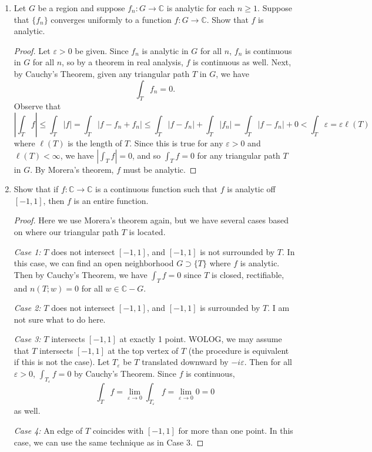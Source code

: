 \documentclass[11pt,oneside,english]{amsart}
\theoremstyle{definition}
\newcommand{\lom}[2]{\lim_{{#1}\rightarrow{#2}}}
\newcommand{\ve}{\varepsilon}
\newcommand{\MB}[1]{\mathbb{#1}}
\begin{document}
\begin{enumerate}[leftmargin=*]
\item Let $G$ be a region and suppose $f_n:G\to\MB{C}$ is analytic for each $n\geq 1$. Suppose that $\{f_n\}$ converges uniformly to a function $f:G\to\MB{C}$. Show that $f$ is analytic.

\begin{proof}
Let $\ve>0$ be given. Since $f_n$ is analytic in $G$ for all $n$, $f_n$ is continuous in $G$ for all $n$, so by a theorem in real analysis, $f$ is continuous as well. Next, by Cauchy's Theorem, given any triangular path $T$ in $G$, we have
\[
\int_T f_n=0.
\]
Observe that
\[
\left|\int_Tf\right|\leq\int_T|f|=\int_T|f-f_n+f_n|\leq \int_T|f-f_n|+\int_T|f_n|=\int_T|f-f_n|+0<\int_T\ve=\ve\ell(T)
\]
where $\ell(T)$ is the length of $T$. Since this is true for any $\ve>0$ and $\ell(T)<\infty$, we have $\left|\int_Tf\right|=0$, and so $\int_Tf=0$ for any triangular path $T$ in $G$. By Morera's theorem, $f$ must be analytic.
\end{proof}


\pagebreak


\item Show that if $f:\MB{C}\to\MB{C}$ is a continuous function such that $f$ is analytic off $[-1,1]$, then $f$ is an entire function.


\begin{proof}
Here we use Morera's theorem again, but we have several cases based on where our triangular path $T$ is located.

\textit{Case 1:} $T$ does not intersect $[-1,1]$, and $[-1,1]$ is not surrounded by $T$. In this case, we can find an open neighborhood $G\supset \{T\}$ where $f$ is analytic. Then by Cauchy's Theorem, we have $\displaystyle \int_Tf=0$ since $T$ is closed, rectifiable, and $n(T;w)=0$ for all $w\in \MB{C}-G$.

\textit{Case 2:}  $T$ does not intersect $[-1,1]$, and $[-1,1]$ is surrounded by $T$. I am not sure what to do here.

\textit{Case 3:} $T$ intersects $[-1,1]$ at exactly 1 point. WOLOG, we may assume that $T$ intersects $[-1,1]$ at the top vertex of $T$ (the procedure is equivalent if this is not the case). Let $T_\ve$ be $T$ translated downward by $-i\ve$. Then for all $\ve >0$, $\int_{T_\ve}f=0$ by Cauchy's Theorem. Since $f$ is continuous,
\[
\int_Tf=\lom{\ve}{0}\int_{T_\ve}f=\lom{\ve}{0}0=0
\]
as well.

\textit{Case 4:} An edge of $T$ coincides with $[-1,1]$ for more than one point. In this case, we can use the same technique as in Case 3.


\end{proof}
\end{enumerate}
\end{document}
